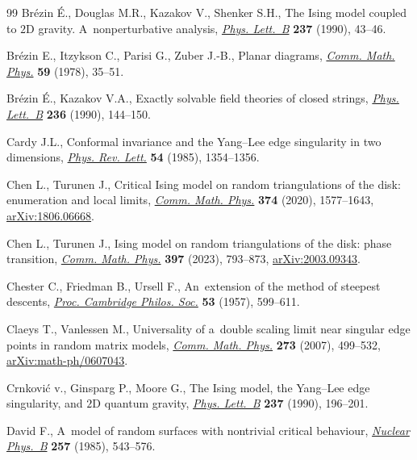 \documentclass[pdftex]{sigma}
\numberwithin{equation}{section}
\begin{document}
\begin{thebibliography}{99}
Br\'ezin {\'E}., Douglas M.R., Kazakov V., Shenker S.H., The {I}sing model
 coupled to {$2$}{D} gravity. {A}~nonperturbative analysis,
 \href{https://doi.org/10.1016/0370-2693(90)90458-I}{\textit{Phys. Lett.~B}}
 \textbf{237} (1990), 43--46.

Br\'ezin E., Itzykson C., Parisi G., Zuber J.-B., Planar diagrams,
 \href{https://doi.org/10.1007/BF01614153}{\textit{Comm. Math. Phys.}}
 \textbf{59} (1978), 35--51.

Br\'ezin {\'E}., Kazakov V.A., Exactly solvable field theories of closed
 strings, \href{https://doi.org/10.1016/0370-2693(90)90818-Q}{\textit{Phys.
 Lett.~B}} \textbf{236} (1990), 144--150.

Cardy J.L., Conformal invariance and the {Y}ang--{L}ee edge singularity in two
 dimensions, \href{https://doi.org/10.1103/PhysRevLett.54.1354}{\textit{Phys.
 Rev. Lett.}} \textbf{54} (1985), 1354--1356.

Chen L., Turunen J., Critical {I}sing model on random triangulations of the
 disk: enumeration and local limits,
 \href{https://doi.org/10.1007/s00220-019-03672-5}{\textit{Comm. Math. Phys.}}
 \textbf{374} (2020), 1577--1643,
 \href{http://arxiv.org/abs/1806.06668}{arXiv:1806.06668}.

Chen L., Turunen J., Ising model on random triangulations of the disk: phase
 transition, \href{https://doi.org/10.1007/s00220-022-04508-5}{\textit{Comm.
 Math. Phys.}} \textbf{397} (2023), 793--873,
 \href{http://arxiv.org/abs/2003.09343}{arXiv:2003.09343}.

Chester C., Friedman B., Ursell F., An~extension of the method of steepest
 descents, \href{https://doi.org/10.1017/s0305004100032655}{\textit{Proc.
 Cambridge Philos. Soc.}} \textbf{53} (1957), 599--611.

Claeys T., Vanlessen M., Universality of a~double scaling limit near singular
 edge points in random matrix models,
 \href{https://doi.org/10.1007/s00220-007-0256-9}{\textit{Comm. Math. Phys.}}
 \textbf{273} (2007), 499--532,
 \href{http://arxiv.org/abs/math-ph/0607043}{arXiv:math-ph/0607043}.

Crnkovi\'c v., Ginsparg P., Moore G., The {I}sing model, the {Y}ang--{L}ee edge
 singularity, and {$2$}{D} quantum gravity,
 \href{https://doi.org/10.1016/0370-2693(90)91428-E}{\textit{Phys. Lett.~B}}
 \textbf{237} (1990), 196--201.

David F., A~model of random surfaces with nontrivial critical behaviour,
 \href{https://doi.org/10.1016/0550-3213(85)90363-3}{\textit{Nuclear Phys.~B}}
 \textbf{257} (1985), 543--576.


\end{thebibliography}
\end{document}
